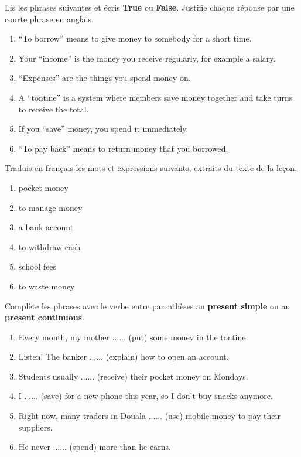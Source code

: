 \documentclass[11pt]{article}
\begin{document}
\begin{exercice}
Lis les phrases suivantes et écris \textbf{True} ou \textbf{False}. Justifie chaque réponse par une courte phrase en anglais.
\begin{enumerate}
\item “To borrow” means to give money to somebody for a short time.
\item Your “income” is the money you receive regularly, for example a salary.
\item “Expenses” are the things you spend money on.
\item A “tontine” is a system where members save money together and take turns to receive the total.
\item If you “save” money, you spend it immediately.
\item “To pay back” means to return money that you borrowed.
\end{enumerate}
\end{exercice}

\begin{exercice}
Traduis en français les mots et expressions suivants, extraits du texte de la leçon.
\begin{enumerate}
\item pocket money
\item to manage money
\item a bank account
\item to withdraw cash
\item school fees
\item to waste money
\end{enumerate}
\end{exercice}

\begin{exercice}
Complète les phrases avec le verbe entre parenthèses au \textbf{present simple} ou au \textbf{present continuous}.
\begin{enumerate}
\item Every month, my mother ...... (put) some money in the tontine.
\item Listen! The banker ...... (explain) how to open an account.
\item Students usually ...... (receive) their pocket money on Mondays.
\item I ...... (save) for a new phone this year, so I don't buy snacks anymore.
\item Right now, many traders in Douala ...... (use) mobile money to pay their suppliers.
\item He never ...... (spend) more than he earns.
\end{enumerate}
\end{exercice}
\end{document}
